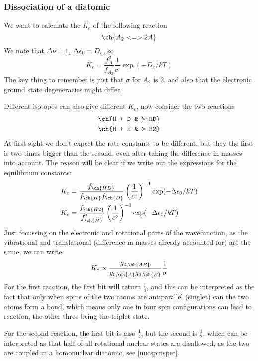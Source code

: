 \subsubsection{Dissociation of a diatomic}
We want to calculate the $K_c$ of the following reaction
\begin{equation*}
  \ch{A_2 <=> 2 A}
\end{equation*}
We note that $\Delta\nu=1$, $\Delta\epsilon_0=D_e$, so
\begin{equation}
  K_c=\frac{f_A^2}{f_{A_2}}\frac{1}{c^{\circ}}\exp(-D_e/kT)
\end{equation}
The key thing to remember is just that $\sigma$ for $A_2$ is 2, and also that the electronic ground state degeneracies might differ.\par
Different isotopes can also give different $K_c$, now consider the two reactions
\begin{equation}
\begin{aligned}
\ch{H + D &-> HD}\\
\ch{H + H &-> H2}
\end{aligned}
\end{equation}
At first sight we don't expect the rate constants to be different, but they the first is two times bigger than the second, even after taking the difference in masses into account. The reason will be clear if we write out the expressions for the equilibrium constants:
\begin{equation}
\begin{aligned}
    &K_c=\frac{f_{\ch{HD}}}{f_{\ch{H}}f_{\ch{D}}}\lf(\frac{1}{c^{\circ}}\rt)^{-1}\exp(-\Delta\ep_0/kT)\\
    &K_c=\frac{f_{\ch{H2}}}{f^2_{\ch{H}}}\lf(\frac{1}{c^{\circ}}\rt)^{-1}\exp(-\Delta\ep_0/kT)
\end{aligned}
\end{equation}
Just focussing on the electronic and rotational parts of the wavefunction, as the vibrational and translational (difference in masses already accounted for) are the same, we can write
\begin{equation}
  K_c\propto\frac{g_{0,\ch{AB}}}{g_{0,\ch{A}}g_{0,\ch{B}}}\frac{1}{\sigma}
\end{equation}
For the first reaction, the first bit will return $\frac{1}{4}$, and this can be interpreted as the fact that only when spins of the two atoms are antiparallel (singlet) can the two atoms form a bond, which means only one in four spin configurations can lead to reaction, the other three being the triplet state.\par
For the second reaction, the first bit is also $\frac{1}{4}$, but the second is $\frac{1}{2}$, which can be interpreted as that half of all rotational-nuclear states are disallowed, as the two are coupled in a homonuclear diatomic, see \cref{nucspinspec}.

